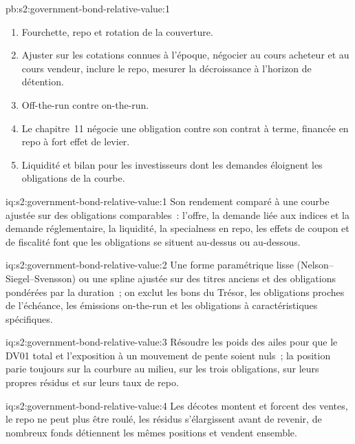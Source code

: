 \begin{solution}{pb:s2:government-bond-relative-value:1}
\begin{enumerate}
\item Fourchette, repo et rotation de la couverture.
\item Ajuster sur les cotations connues à l'époque, négocier au cours acheteur et au cours vendeur, inclure le repo, mesurer la décroissance à l'horizon de détention.
\item Off-the-run contre on-the-run.
\item Le chapitre~11 négocie une obligation contre son contrat à terme, financée en repo à fort effet de levier.
\item Liquidité et bilan pour les investisseurs dont les demandes éloignent les obligations de la courbe.
\end{enumerate}
\end{solution}

\begin{solution}{iq:s2:government-bond-relative-value:1}
Son rendement comparé à une courbe ajustée sur des obligations comparables~: l'offre, la demande liée aux indices et la demande réglementaire, la liquidité, la specialness en repo, les effets de coupon et de fiscalité font
que les obligations se situent au-dessus ou au-dessous.
\end{solution}

\begin{solution}{iq:s2:government-bond-relative-value:2}
Une forme paramétrique lisse (Nelson--Siegel--Svensson) ou une spline ajustée sur des titres anciens et des obligations pondérées par la duration~; on exclut les bons du Trésor, les obligations proches
de l'échéance, les émissions on-the-run et les obligations à caractéristiques spécifiques.
\end{solution}

\begin{solution}{iq:s2:government-bond-relative-value:3}
Résoudre les poids des ailes pour que le DV01 total et l'exposition à un mouvement de pente soient nuls~; la position parie toujours sur la courbure au milieu, sur les trois
obligations, sur leurs propres résidus et sur leurs taux de repo.
\end{solution}

\begin{solution}{iq:s2:government-bond-relative-value:4}
Les décotes montent et forcent des ventes, le repo ne peut plus être roulé, les résidus s'élargissent avant de revenir, de nombreux fonds détiennent les mêmes positions et vendent ensemble.
\end{solution}

